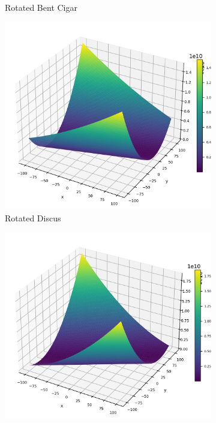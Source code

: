 \begin{figure}[p]
\begin{subfigure}{0.32\textwidth}
        \caption{Rotated Bent Cigar}
    \end{subfigure}
    \begin{subfigure}{0.32\textwidth}
        \centering
        \includegraphics[width=1\textwidth]{Figures/benchmark_plots/Rotated_Discus_maximized.png}
        \caption{Rotated Discus}
    \end{subfigure}
        \begin{subfigure}{0.32\textwidth}
        \centering
        \includegraphics[width=1\textwidth]{Figures/benchmark_plots/Rotated_High_Conditioned_Elliptic_maximized.png}

\end{subfigure}
\end{figure}
